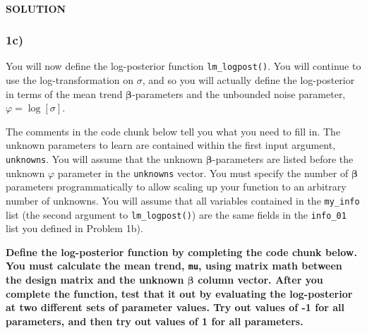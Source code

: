 \documentclass[
]{article}
\newenvironment{Shaded}{\begin{snugshade}}{\end{snugshade}}
\newcommand{\AttributeTok}[1]{\textcolor[rgb]{0.77,0.63,0.00}{#1}}
\newcommand{\DecValTok}[1]{\textcolor[rgb]{0.00,0.00,0.81}{#1}}
\newcommand{\FunctionTok}[1]{\textcolor[rgb]{0.00,0.00,0.00}{#1}}
\newcommand{\NormalTok}[1]{#1}
\newcommand{\OtherTok}[1]{\textcolor[rgb]{0.56,0.35,0.01}{#1}}
\newcommand{\SpecialCharTok}[1]{\textcolor[rgb]{0.00,0.00,0.00}{#1}}
\begin{document}
\hypertarget{solution-1}{%
\paragraph{SOLUTION}\label{solution-1}}

\begin{Shaded}
\end{Shaded}

\hypertarget{c}{%
\subsubsection{1c)}\label{c}}

You will now define the log-posterior function \texttt{lm\_logpost()}.
You will continue to use the log-transformation on \(\sigma\), and so
you will actually define the log-posterior in terms of the mean trend
\(\boldsymbol{\beta}\)-parameters and the unbounded noise parameter,
\(\varphi = \log\left[\sigma\right]\).

The comments in the code chunk below tell you what you need to fill in.
The unknown parameters to learn are contained within the first input
argument, \texttt{unknowns}. You will assume that the unknown
\(\boldsymbol{\beta}\)-parameters are listed before the unknown
\(\varphi\) parameter in the \texttt{unknowns} vector. You must specify
the number of \(\boldsymbol{\beta}\) parameters programmatically to
allow scaling up your function to an arbitrary number of unknowns. You
will assume that all variables contained in the \texttt{my\_info} list
(the second argument to \texttt{lm\_logpost()}) are the same fields in
the \texttt{info\_01} list you defined in Problem 1b).

\textbf{Define the log-posterior function by completing the code chunk
below. You must calculate the mean trend, \texttt{mu}, using matrix math
between the design matrix and the unknown \(\boldsymbol{\beta}\) column
vector. After you complete the function, test that it out by evaluating
the log-posterior at two different sets of parameter values. Try out
values of -1 for all parameters, and then try out values of 1 for all
parameters.}
\end{document}
